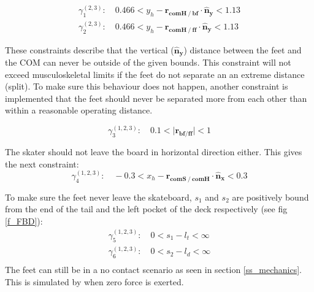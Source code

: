 \documentclass[default,iicol]{sn-jnl}
\begin{document}
\begin{equation}\label{e_yeadon}
\begin{array}{c}
    \gamma_{1}^{(2,3)}:\quad  0.466 < y_h - \mathbf{r_{comH \mathbin{/} bf}} \cdot \mathbf{\hat n_y} < 1.13 \\ 
    \gamma_{2}^{(2,3)}:\quad  0.466 < y_h - \mathbf{r_{comH \mathbin{/} ff}} \cdot \mathbf{\hat n_y} < 1.13 
\end{array}
\end{equation}

These constraints describe that the vertical ($\mathbf{ \hat n_y}$) distance between the feet and the COM can never be outside of the given bounds. This constraint will not exceed musculoskeletal limits if the feet do not separate an an extreme distance (split). To make sure this behaviour does not happen, another constraint is implemented that the feet should never be separated more from each other than within a reasonable operating distance.

\begin{equation}
        \gamma_{3}^{(1,2,3)}:\quad   0.1 < \vert \mathbf{r_{bf/ff}} \vert < 1
\end{equation}

The skater should not leave the board in horizontal direction either. This gives the next constraint:
\begin{equation}
    \gamma_4^{(1,2,3)}:\quad  -0.3 < x_h - \mathbf{r_{comS\mathbin{/}comH}}\cdot \mathbf{\hat n_x} < 0.3
\end{equation}

To make sure the feet never leave the skateboard, $s_1$ and $s_2$ are positively bound from the end of the tail and the left pocket of the deck respectively (see fig \ref{f_FBD}):
\begin{equation}
\begin{array}{c}
    \gamma_{5}^{(1,2,3)}:\quad  0 < s_1-l_t < \infty  \\
    \gamma_{6}^{(1,2,3)}:\quad  0 < s_2-l_d < \infty  \\
\end{array}
\end{equation}
The feet can still be in a no contact scenario as seen in section \ref{ss_mechanics}. This is simulated by when zero force is exerted. 
\end{document}
